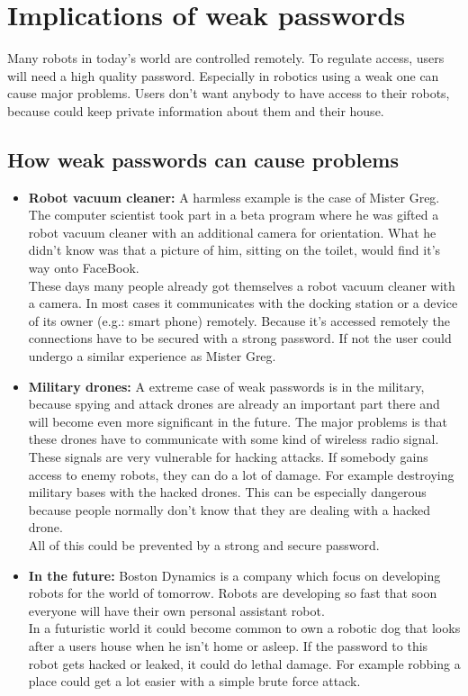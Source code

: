\documentclass[conference]{IEEEtran}
\begin{document}
\section{Implications of weak passwords}
Many robots in today's world are controlled remotely. To regulate access, users will need a high quality password. Especially in robotics using a weak one can cause major problems. Users don't want anybody to have access to their robots, because could keep private information about them and their house.

\subsection{How weak passwords can cause problems}

\begin{itemize}
\item \textbf{Robot vacuum cleaner:} A harmless example is the case of Mister Greg. The computer scientist took part in a beta program where he was gifted a robot vacuum cleaner with an additional camera for orientation. What he didn't know was that a picture of him, sitting on the toilet, would find it's way onto FaceBook. \cite{b10}\\
These days many people already got themselves a robot vacuum cleaner with a camera. In most cases it communicates with the docking station or a device of its owner (e.g.: smart phone) remotely. Because it's accessed remotely the connections have to be secured with a strong password. If not the user could undergo a similar experience as Mister Greg. 
\item \textbf{Military drones:} A extreme case of weak passwords is in the military, because spying and attack drones are already an important part there and will become even more significant in the future. The major problems is that these drones have to communicate with some kind of wireless radio signal. These signals are very vulnerable for hacking attacks. If somebody gains access to enemy robots, they can do a lot of damage. For example destroying military bases with the hacked drones. This can be especially dangerous because people normally don't know that they are dealing with a hacked drone.\\
All of this could be prevented by a strong and secure password.
\item \textbf{In the future:} Boston Dynamics is a company which focus on developing robots for the world of tomorrow. Robots are developing so fast that soon everyone will have their own personal assistant robot. \cite{b12}\\
In a futuristic world it could become common to own a robotic dog that looks after a users house when he isn't home or asleep. If the password to this robot gets hacked or leaked, it could do lethal damage. For example robbing a place could get a lot easier with a simple brute force attack.
\end{itemize}
\end{document}
